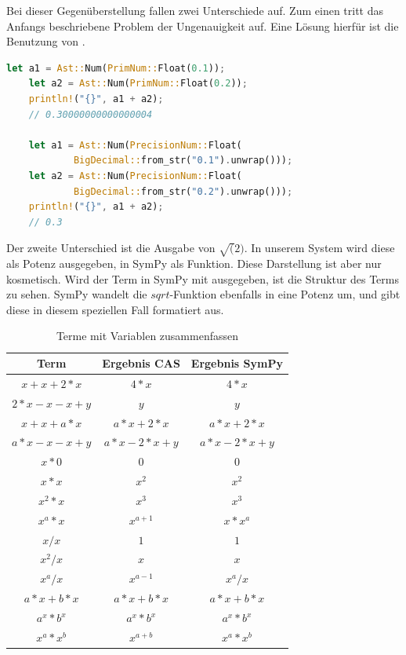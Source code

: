 \documentclass[11pt,a4paper, ngerman]{article}
\begin{document}
Bei dieser Gegenüberstellung fallen zwei Unterschiede auf. Zum einen tritt das Anfangs beschriebene Problem der Ungenauigkeit auf. Eine Lösung hierfür ist die Benutzung von .

\begin{lstlisting}[language=rust, caption={PrimNum vs. PrecisionNum}]
    let a1 = Ast::Num(PrimNum::Float(0.1));
    let a2 = Ast::Num(PrimNum::Float(0.2));
    println!("{}", a1 + a2);
    // 0.30000000000000004

    let a1 = Ast::Num(PrecisionNum::Float(
            BigDecimal::from_str("0.1").unwrap()));
    let a2 = Ast::Num(PrecisionNum::Float(
            BigDecimal::from_str("0.2").unwrap()));
    println!("{}", a1 + a2);
    // 0.3
\end{lstlisting}

Der zweite Unterschied ist die Ausgabe von $\sqrt(2)$. In unserem System wird diese als Potenz ausgegeben, in SymPy als Funktion. Diese Darstellung ist aber nur kosmetisch. Wird der Term in SymPy mit  ausgegeben, ist die Struktur des Terms zu sehen. SymPy wandelt die $sqrt$-Funktion ebenfalls in eine Potenz um, und gibt diese in diesem speziellen Fall formatiert aus.

\begin{table}[h!]
    \caption{Terme mit Variablen zusammenfassen}
    \centering
    \begin{tabular}{|c|c|c|}
        \hline
        \textbf{Term} & \textbf{Ergebnis CAS} & \textbf{Ergebnis SymPy} \\
        \hline
        $x+x+2*x$ & $4*x$ & $4*x$ \\
        \hline
        $2*x-x-x+y$ & $y$ & $y$ \\
        \hline
        $x+x+a*x$ & $a*x+2*x$ & $a*x + 2*x$ \\
        \hline
        $a*x-x-x+y$ & $a*x-2*x+y$ & $a*x - 2*x + y$ \\
        \hline
        $x*0$ & $0$ & $0$ \\
        \hline
        $x*x$ & $x^2$ & $x^2$ \\
        \hline
        $x^2*x$ & $x^3$ & $x^3$ \\
        \hline
        $x^a*x$ & $x^{a+1}$ & $x*x^a$ \\
        \hline
        $x/x$ & $1$ & $1$ \\
        \hline
        $x^2/x$ & $x$ & $x$ \\
        \hline
        $x^a/x$ & $x^{a-1}$ & $x^a/x$ \\
        \hline
        $a*x+b*x$ & $a*x+b*x$ & $a*x+b*x$ \\
        \hline
        $a^x*b^x$ & $a^x*b^x$ & $a^x*b^x$ \\
        \hline
        $x^a*x^b$ & $x^{a+b}$ & $x^a*x^b$ \\
        \hline
    \end{tabular}
\end{table}
\end{document}
